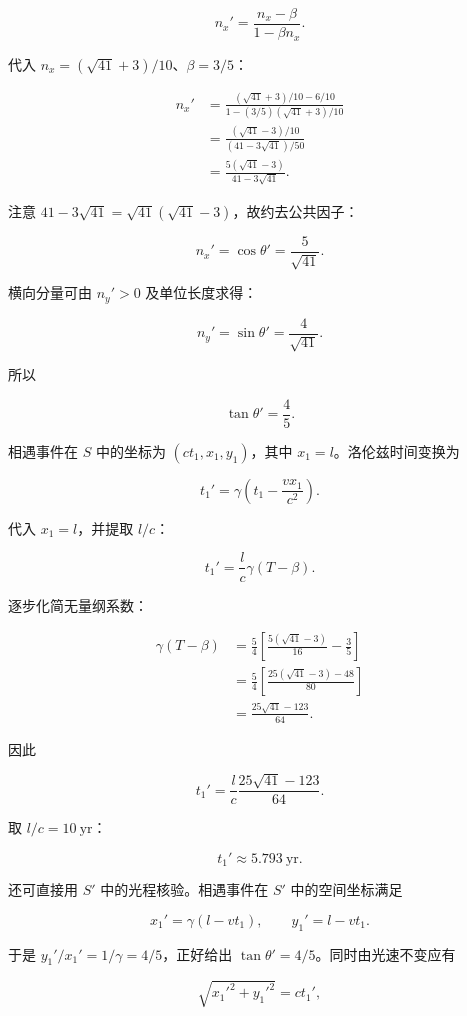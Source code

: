 \documentclass[12pt,a4paper,UTF8]{ctexart}
\begin{document}
\[
n_x'=\frac{n_x-\beta}{1-\beta n_x}. \tag{23}
\]

代入 \(n_x=(\sqrt{41}+3)/10\)、\(\beta=3/5\)：

\[
\begin{aligned}
n_x'
&=\frac{(\sqrt{41}+3)/10-6/10}
{1-(3/5)(\sqrt{41}+3)/10}\\
&=\frac{(\sqrt{41}-3)/10}
{(41-3\sqrt{41})/50}\\
&=\frac{5(\sqrt{41}-3)}{41-3\sqrt{41}}.
\end{aligned} \tag{24}
\]

注意 \(41-3\sqrt{41}=\sqrt{41}(\sqrt{41}-3)\)，故约去公共因子：

\[
\boxed{n_x'=\cos\theta'=\frac5{\sqrt{41}}}. \tag{25}
\]

横向分量可由 \(n_y'>0\) 及单位长度求得：

\[
\boxed{n_y'=\sin\theta'=\frac4{\sqrt{41}}}. \tag{26}
\]

所以

\[
\boxed{\tan\theta'=\frac45}. \tag{27}
\]

相遇事件在 \(S\) 中的坐标为 \((ct_1,x_1,y_1)\)，其中
\(x_1=l\)。洛伦兹时间变换为

\[
t_1'=\gamma\left(t_1-\frac{vx_1}{c^2}\right). \tag{28}
\]

代入 \(x_1=l\)，并提取 \(l/c\)：

\[
t_1'=\frac lc\gamma(T-\beta). \tag{29}
\]

逐步化简无量纲系数：

\[
\begin{aligned}
\gamma(T-\beta)
&=\frac54\left[
\frac{5(\sqrt{41}-3)}{16}-\frac35
\right]\\
&=\frac54\left[
\frac{25(\sqrt{41}-3)-48}{80}
\right]\\
&=\frac{25\sqrt{41}-123}{64}.
\end{aligned} \tag{30}
\]

因此

\[
\boxed{
t_1'=\frac lc\frac{25\sqrt{41}-123}{64}}. \tag{31}
\]

取 \(l/c=10\ \mathrm{yr}\)：

\[
\boxed{t_1'\approx5.793\ \mathrm{yr}}. \tag{32}
\]

还可直接用 \(S'\) 中的光程核验。相遇事件在 \(S'\) 中的空间坐标满足

\[
x_1'=\gamma(l-vt_1),
\qquad
y_1'=l-vt_1. \tag{33}
\]

于是 \(y_1'/x_1'=1/\gamma=4/5\)，正好给出
\(\tan\theta'=4/5\)。同时由光速不变应有

\[
\sqrt{x_1'^2+y_1'^2}=ct_1', \tag{34}
\]
\end{document}
